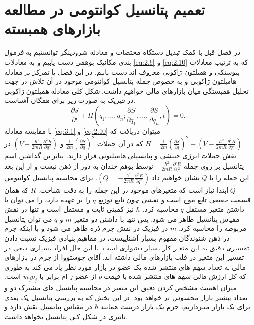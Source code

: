 \documentclass[a4paper,titlepage,12pt,fleqn,oneside]{report}
\begin{document}
\chapter{تعمیم پتانسیل کوانتومی در مطالعه بازارهای همبسته}
در فصل قبل با کمک تبدیل دستگاه مختصات و معادله شرودینگر توانستیم به فرمول بندی مکانیک بوهمی دست یابیم و به معادلات \ref{eq:2.9} و  \ref{eq:2.10} که به ترتیب معادلات پیوستکی و همیلتون-ژاکوبی معروف اند دست یابیم. در این فصل با تمرکز بر معادله هامیلتون ژاکوبی و به خصوص جمله پتانسیل کوانتومی موجود در آن تلاش در جهت تحلیل همبستگی میان بازارهای مالی خواهیم داشت. شکل کلی معادله همیلتون-ژاکوبی در فیزیک به صورت زیر برای همگان آشناست.
\begin{equation}
\frac{\partial S}{\partial t} +H\left(q_1, ...,q_n; \frac{\partial S}{\partial q_1}, ...,\frac{\partial S}{\partial q_n}, t\right) =0.
\label{eq:3.1}
\end{equation}
با مقایسه معادله \ref{eq:3.1} و \ref{eq:2.10}  میتوان دریافت که 
$H=\frac{1}{2m} \left(\frac{\partial S}{\partial q}\right)^2+
\left(V-\frac{\hbar^2}{2mR} \frac{\partial^2 R}{\partial q^2}\right)$
که در آن جملات
$\frac{1}{2m} \left(\frac{\partial S}{\partial q}\right)^2$
و
$\left(V-\frac{\hbar^2}{2mR} \frac{\partial^2 R}{\partial q^2}\right)$
در نقش جملات انرژی جنبشی و پتانسیلی هامیلتونی قرار دارند.  بنابراین گذاشتن اسم پتانسیل بر روی جمله 
$-\frac{\hbar^2}{2mR} \frac{\partial^2 R}{\partial q^2}$
توسط بوهم چندان به دور از ذهن نیست و از این بعد این جمله را با $Q$ نشان خواهیم داد
$\left(Q=-\frac{\hbar^2}{2mR} \frac{\partial^2 R}{\partial q^2}\right)$.
برای محاسبه پتانسیل کوانتومی $Q$ ابتدا نیاز است که متغیرهای موجود در این جمله را به دقت شناخت. $R$  که همان قسمت حقیقی تابع موج است و نقشی چون تابع توزیع $q$ را بر عهده دارد، را می توان با داشتن متغیر مستقل 
$q$
محاسبه کرد. $\hbar$ نیز کمیتی ثابت و مستقل است و تنها در نقش مقیاس پتانسیل ظاهر می شود. پس تنها با داشتن دو متغیر $m$ و $q$ می توان پتانسیل مربوطه را محاسبه کرد. $m$ در فیزیک در نقش جرم ذره ظاهر می شود و با اینکه جرم در ذهن شنوندگان مفهوم بسیار آشناییست، در مفاهیم بنیادی فیزیک نسبت دادن تفسیری دقیق به این متغیر کار بسیار دشواری است. با این حال افراد بسیاری سعی در تفسیر این متغیر در قلب بازارهای مالی داشته اند. آقای چوستووا از جرم در بازارهای مالی به تعداد سهم های منتشر شده یک عضو در بازار مورد نظر یاد می کند به طوری که کل ارزش مالی سهم های منتشر شده با قیمت $p$ از عضو $j$ ام برابر با $m_jp_j$  است. میزان اهمیت مشخص کردن دقیق این متغیر در محاسبه پتانسیل های مشترک دو و تعداد بیشتر بازار محسوس تر خواهد بود. در این بخش که به بررسی پتانسیل یک بعدی برای یک بازار میپردازیم، جرم یک بازار درست همانند $\hbar$ در مقیاس پتانسیل نقش دارد و تاثیری در شکل کلی پتانسیل نخواهد داشت. 
\end{document}
